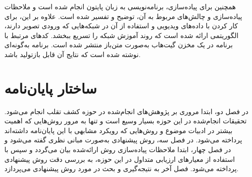 همچنین برای پیاده‌سازی، برنامه‌نویسی به زبان پایتون انجام شده است و ملاحظات پیاده‌سازی و چالش‌های مربوط به آن، توضیح و تفسیر شده است. علاوه بر این، برای کار کردن با داده‌های ویدیویی و استفاده از آن در شبکه‌هایی که ورودی تصویر دارند، الگوریتمی ارائه شده است که روند آموزش شبکه را تسریع ببخشد. کدهای مرتبط با برنامه در یک مخزن گیت‌هاب
 به‌صورت متن‌باز منتشر شده است. برنامه به‌گونه‌ای نوشته شده است که نتایج آن قابل بازتولید باشد.
\section{ساختار پایان‌نامه}
در فصل دو، ابتدا مروری بر پژوهش‌های انجام‌شده در حوزه کشف تقلب انجام می‌شود. تحقیقات انجام‌شده در این حوزه بسیار وسیع است و تنها به مرور روش‌هایی که اهمیت بیشتر در ادبیات موضوع و روش‌هایی که رویکرد مشابهی با این پایان‌نامه داشته‌اند پرداخته می‌شود. در فصل سه، روش پیشنهادی به‌صورت مبانی نظری گفته می‌شود و در فصل چهار، ابتدا ملاحظات پیاده‌سازی روش ارائه‌شده بیان می‌گردد و سپس با استفاده از معیارهای ارزیابی متداول در این حوزه، به بررسی دقت روش پیشنهادی پرداخته می‌شود. فصل آخر به نتیجه‌گیری و بحث در مورد روش پیشنهادی می‌پردازد.


